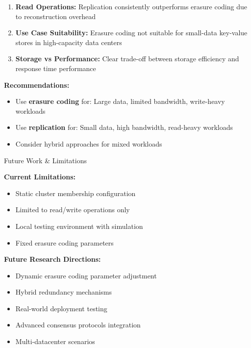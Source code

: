 \documentclass[a2,portrait]{config/poster/a0poster}
\newcommand{\postersection}[1]{%
	\begin{tcolorbox}[
			colback=ITBblue,
			colframe=ITBblue,
			fonttitle=\bfseries,
			coltext=white,
			sharp corners,
			boxrule=0pt,
			top=0pt,
			bottom=0pt,
			halign=center
		]
		\normalsize #1
	\end{tcolorbox}%
}
\begin{document}
\begin{multicols}{2}
\begin{enumerate}
		\item \textbf{Read Operations:} Replication consistently outperforms erasure coding due to reconstruction overhead
		
		\item \textbf{Use Case Suitability:} Erasure coding not suitable for small-data key-value stores in high-capacity data centers
		
		\item \textbf{Storage vs Performance:} Clear trade-off between storage efficiency and response time performance
	\end{enumerate}

	\textbf{Recommendations:}
	\begin{itemize}
		\item Use \textcolor{ECcolor}{\textbf{erasure coding}} for: Large data, limited bandwidth, write-heavy workloads
		\item Use \textcolor{REPcolor}{\textbf{replication}} for: Small data, high bandwidth, read-heavy workloads
		\item Consider hybrid approaches for mixed workloads
	\end{itemize}


	\postersection{Future Work \& Limitations}
	
	\textbf{Current Limitations:}
	\begin{itemize}
		\item Static cluster membership configuration
		\item Limited to read/write operations only
		\item Local testing environment with simulation
		\item Fixed erasure coding parameters
	\end{itemize}

	\textbf{Future Research Directions:}
	\begin{itemize}
		\item Dynamic erasure coding parameter adjustment
		\item Hybrid redundancy mechanisms
		\item Real-world deployment testing
		\item Advanced consensus protocols integration
		\item Multi-datacenter scenarios
	\end{itemize}


\end{multicols}
\end{document}
